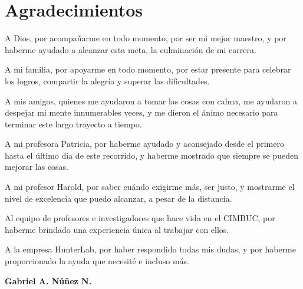 \chapter*{Agradecimientos}

	A Dios, por acompa\~{n}arme en todo momento, por ser mi mejor maestro, y por haberme ayudado a alcanzar esta meta, la culminaci\'{o}n de mi carrera.

	A mi familia, por apoyarme en todo momento, por estar presente para celebrar los logros, compartir la alegr\'{i}a y superar las dificultades.

	A mis amigos, quienes me ayudaron a tomar las cosas con calma, me ayudaron a despejar mi mente innumerables veces, y me dieron el \'{a}nimo necesario para terminar este largo trayecto a tiempo.

	A mi profesora Patricia, por haberme ayudado y aconsejado desde el primero hasta el \'{u}ltimo d\'{i}a de este recorrido, y haberme mostrado que siempre se pueden mejorar las cosas.

	A mi profesor Harold, por saber cu\'{a}ndo exigirme m\'{a}s, ser justo, y mostrarme el nivel de excelencia que puedo alcanzar, a pesar de la distancia.

	Al equipo de profesores e investigadores que hace vida en el CIMBUC, por haberme brindado una experiencia \'{u}nica al trabajar con ellos.

	A la empresa HunterLab, por haber respondido todas mis dudas, y por haberme proporcionado la ayuda que necesit\'{e} e incluso m\'{a}s.


\begin{flushright}
	\textbf{Gabriel A. N\'{u}\~{n}ez N.}
\end{flushright}
